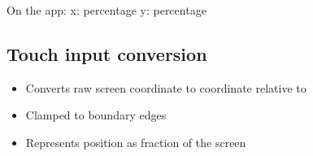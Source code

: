 \documentclass[letterpaper,10pt,english]{sphinxmanual}
\begin{document}
\sphinxAtStartPar
On the app:
\sphinxhyphen{} x: percentage
\sphinxhyphen{} y: percentage


\subsection{Touch input conversion}
\label{\detokenize{technical_reference:touch-input-conversion}}
\sphinxAtStartPar
{}

\begin{sphinxVerbatim}[commandchars=\\\{\}]
\end{sphinxVerbatim}
\begin{itemize}
\item {} 
\sphinxAtStartPar
Converts raw screen coordinate to coordinate relative to 

\item {} 
\sphinxAtStartPar
Clamped to boundary edges

\end{itemize}

\sphinxAtStartPar
{}

\begin{sphinxVerbatim}[commandchars=\\\{\}]
\end{sphinxVerbatim}
\begin{itemize}
\item {} 
\sphinxAtStartPar
Represents position as fraction of the screen

\end{itemize}

\sphinxAtStartPar
{}
\end{document}
